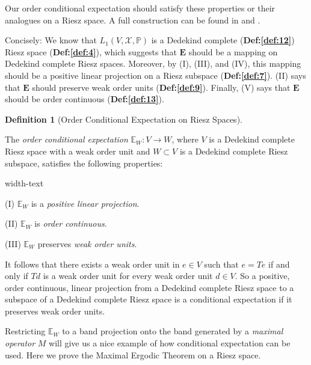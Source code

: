 \documentclass[letterpaper,10pt,oneside,onecolumn,reqno]{amsart}
\newcommand{\E}{\mathbb E}
\renewcommand{\P}{\mathbb P}
\newcommand{\X}{\mathcal X}
\theoremstyle{definition}
\newtheorem{defn}{Definition}
\begin{document}
Our order conditional expectation should satisfy these properties or
their analogues on a Riesz space. A full construction can be found in
\cite{Kuo2004435} and \cite{Kuo2005509}.

\begin{framed}
  Concisely: We know that $L_1(V,\X,\P)$ is a Dedekind complete
  (\textbf{Def:\ref{def:12}}) Riesz space (\textbf{Def:\ref{def:4}}),
  which suggests that $\mathbf{E}$ should be a mapping on Dedekind
  complete Riesz spaces. Moreover, by (I), (III), and (IV), this
  mapping should be a positive
  linear projection on a Riesz subspace
  (\textbf{Def:\ref{def:7}}). (II) says that $\mathbf{E}$ should
  preserve weak order units (\textbf{Def:\ref{def:9}}). Finally, (V)
  says that $\mathbf{E}$ should be order continuous
  (\textbf{Def:\ref{def:13}}).
\end{framed}

\begin{defn}[Order Conditional Expectation on Riesz
  Spaces]\label{def:15}

  The \emph{order conditional
    expectation} $\E_W: V \to W$, where $V$ is a Dedekind complete
  Riesz space with a weak order unit and $W \subset V$ is a Dedekind
  complete Riesz subspace, satisfies the following properties:

  \begin{deflist}{width-text}
  \item[(I)] $\E_W$ is a \emph{positive linear projection}.
  \item[(II)] $\E_W$ is \emph{order continuous}.
  \item[(III)] $\E_W$ preserves \emph{weak order units}.
  \end{deflist}
\end{defn}

\begin{framed}
  It follows that there exists a weak order unit in $e \in V$ such
  that $e = Te$ if and only if $Td$ is a weak order unit for every
  weak order unit $d \in V$. So a positive, order continuous, linear
  projection from a Dedekind complete Riesz space to a subspace of a
  Dedekind complete Riesz space is a conditional expectation if it
  preserves weak order units.
\end{framed}

Restricting $\E_W$ to a band projection onto the band generated by a
\emph{maximal operator} $M$ will give us a
nice example of how conditional expectation can be used. Here we prove
the Maximal Ergodic Theorem on a Riesz space.
\end{document}
